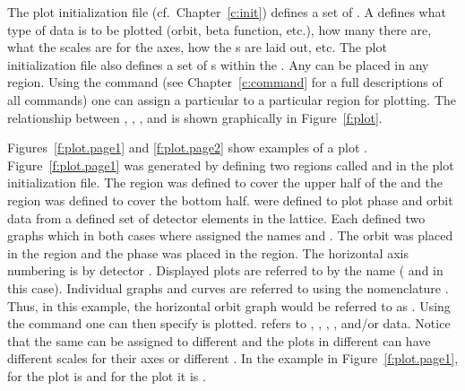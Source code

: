 The plot initialization file (cf.~Chapter~\ref{c:init}) defines a set
of . A  defines what type of data is
to be plotted (orbit, beta function, etc.), how many  there are,
what the scales are for the  axes, how the s are
laid out, etc.  The plot initialization file also defines a set of
s within the . Any  can be
placed in any region. Using the  command (see
Chapter~\ref{c:command} for a full descriptions of all commands) one
can assign a particular  to a particular region for
plotting.  The relationship between , ,
, and  is shown graphically in
Figure~\ref{f:plot}.

Figures~\ref{f:plot.page1} and \ref{f:plot.page2} show examples of a
plot . Figure~\ref{f:plot.page1} was generated by defining
two regions called  and  in the plot initialization
file. The  region was defined to cover the upper half of the
 and the  region was defined to cover the bottom
half.  were defined to plot phase and orbit data
from a defined set of detector elements in the lattice. Each
 defined two graphs which in both cases where
assigned the names  and . The orbit  was
placed in the  region and the phase  was
placed in the  region. The horizontal axis numbering is by
detector .  Displayed plots are referred to by the
 name ( and  in this case). Individual
graphs and curves are referred to using the nomenclature
. Thus, in this example, the horizontal orbit graph
would be referred to as .  Using the  command one
can then specify  is plotted.  refers to
, , , , and/or
 data.  Notice that the same  can be
assigned to different  and the plots in different
 can have different scales for their axes or different
. In the example in Figure~\ref{f:plot.page1},  for
the  plot is  and for the  plot it is
.


